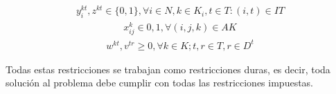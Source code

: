         \begin{align} \label{eq:15}
            y_{i}^{k t}, z^{k t} \in \{0, 1\}, \forall i\in N, k \in K_i, t\in T : (i, t) \in IT
        \end{align}
        \begin{align} \label{eq:16}
            x_{i j} ^ k \in {0, 1}, \forall (i, j, k) \in AK
        \end{align}
        \begin{align} \label{eq:17}
            w^{k t}, v^{t r} \geq 0 , \forall k \in K; t, r \in T, r\in D^t
        \end{align}


Todas estas restricciones se trabajan como restricciones duras, es decir, toda solución al
problema debe cumplir con todas las restricciones impuestas.
